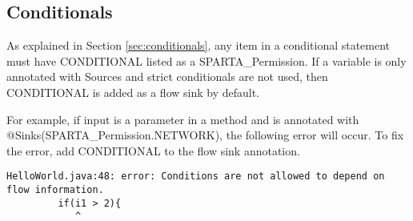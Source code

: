 \subsection{Conditionals}
As explained in Section \ref{sec:conditionals}, any item in a conditional statement must have CONDITIONAL listed as a SPARTA_Permission.  If a variable is only annotated with Sources and strict conditionals are not used, then CONDITIONAL is added as a flow sink by default. 

For example, if input is a parameter in a method and is annotated with @Sinks(SPARTA_Permission.NETWORK), the following error will occur.  To fix the error, add CONDITIONAL to the flow sink annotation.  

\begin{Verbatim}
HelloWorld.java:48: error: Conditions are not allowed to depend on flow information.
         if(i1 > 2){
            ^
\end{Verbatim}




